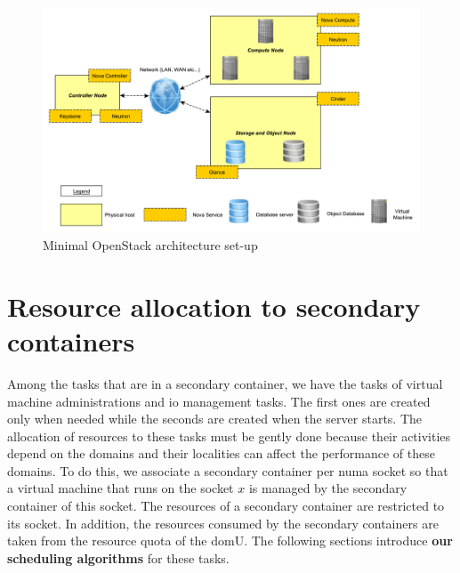 \begin{figure}[!h]
    \centering
    \includegraphics[width=\linewidth]{fig04/minimalArchiOpentStack.pdf}
    \caption{Minimal OpenStack architecture set-up}
    \label{fig:miniO}
\end{figure}

\section{Resource allocation to secondary containers}
Among the tasks that are in a secondary container, we have the tasks of virtual machine administrations and \acrshort{io} management tasks. The first ones are created only when needed while the seconds are created when the server starts. The allocation of resources to these tasks must be gently done because their activities depend on the domains and their localities can affect the performance of these domains. To do this, we associate a secondary container per \acrshort{numa} socket so that a virtual machine that runs on the socket $ x $ is managed by the secondary container of this socket. The resources of a secondary container are restricted to its socket. In addition, the resources consumed by the secondary containers are taken from the resource quota of the domU. The following sections introduce \textbf{our scheduling algorithms} for these tasks.


